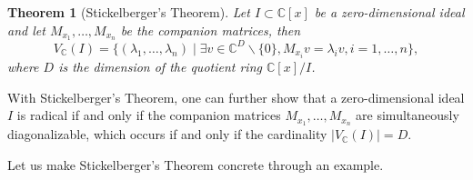 \documentclass[
]{book}
\newtheorem{theorem}{Theorem}[chapter]
\theoremstyle{definition}
\theoremstyle{definition}
\theoremstyle{definition}
\theoremstyle{definition}
\theoremstyle{remark}
\begin{document}
\begin{theorem}[Stickelberger's Theorem]
\protect\hypertarget{thm:StickelbergerTheorem}{}\label{thm:StickelbergerTheorem}Let \(I \subset \mathbb{C}[x]\) be a zero-dimensional ideal and let \(M_{x_1},\dots,M_{x_n}\) be the companion matrices, then
\[
V_{\mathbb{C}}(I) = \{ (\lambda_1,\dots,\lambda_n) \mid \exists v \in \mathbb{C}^D \backslash \{0 \}, M_{x_i} v = \lambda_i v, i=1,\dots,n  \},
\]
where \(D\) is the dimension of the quotient ring \(\mathbb{C}[x]/I\).
\end{theorem}

With Stickelberger's Theorem, one can further show that a zero-dimensional ideal \(I\) is radical if and only if the companion matrices \(M_{x_1},\dots,M_{x_n}\) are simultaneously diagonalizable, which occurs if and only if the cardinality \(|V_{\mathbb{C}}(I)| = D\).

Let us make Stickelberger's Theorem concrete through an example.
\end{document}
